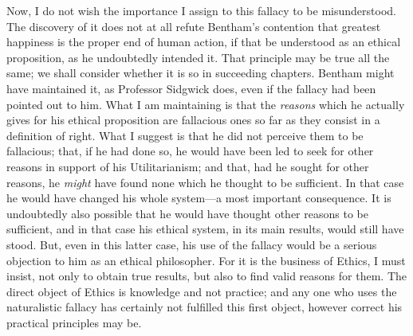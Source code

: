 Now, I do not wish the importance I assign to this fallacy to be
misunderstood. The discovery of it does not at all refute Bentham's
contention that greatest happiness is the proper end of human action,
if that be understood as an ethical proposition, as he undoubtedly
intended it. That principle may be true all the same; we shall
consider whether it is so in succeeding chapters. Bentham might have
maintained it, as Professor Sidgwick does, even if the fallacy had
been pointed out to him. What I am maintaining is that the
\textit{reasons} which he actually gives for his ethical proposition
are fallacious ones so far as they consist in a definition of right.
What I suggest is that he did not perceive them to be fallacious;
that, if he had done so, he would have been led to seek for other
reasons in support of his Utilitarianism; and that, had he sought for
other reasons, he \textit{might} have found none which he thought to
be sufficient. In that case he would have changed his whole system---a
most important consequence. It is undoubtedly also possible that he
would have thought other reasons to be sufficient, and in that case
his ethical system,  in its main results, would still have
stood. But, even in this latter case, his use of the fallacy would be
a serious objection to him as an ethical philosopher. For it is the
business of Ethics, I must insist, not only to obtain true results,
but also to find valid reasons for them. The direct object of Ethics
is knowledge and not practice; and any one who uses the naturalistic
fallacy has certainly not fulfilled this first object, however correct
his practical principles may be.


